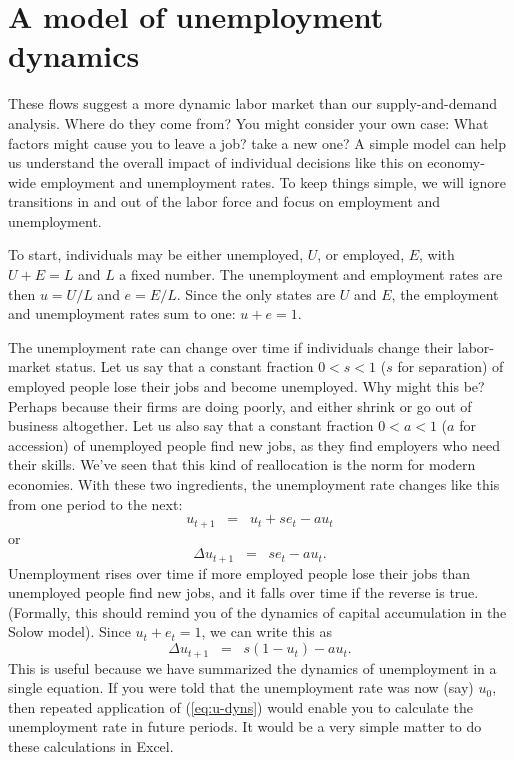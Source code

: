 \section{A model of  unemployment dynamics }

These flows suggest a more dynamic labor market than our supply-and-demand
analysis.
Where do they come from?
You might consider your own case:
What factors might cause you to leave a job?  take a new one?
A simple model can help us understand the overall
impact of individual decisions like this on economy-wide
employment and unemployment rates.
To keep things simple, we will ignore transitions in and out of the labor
force and focus on employment and unemployment.

To start, individuals may be either unemployed, $U$, or employed, $E$, with $U+E={L}$ and $L$ a fixed number.
The unemployment and employment rates are then $u=U/{L}$ and $e=E/{L}$.
Since the only states are $U$ and $E$,
the employment and unemployment rates sum to one: $ u+e=1$.

The unemployment rate can change over time if individuals
change their labor-market status.
Let us say that a constant fraction $0<s<1$ ($s$ for separation)
of employed people lose
their jobs and become unemployed.
Why might this be?  Perhaps because their firms are doing poorly,
and either shrink or go out of business altogether.
Let us also say that a constant fraction $0<a<1$ ($a$ for accession) of
unemployed people find new jobs, as they find employers who need their skills.
We've seen that this kind of reallocation is the norm for modern economies.
With these two ingredients, the unemployment rate changes like this
from one period to the next:
\begin{equation*}
    u_{t+1} \;\;=\;\; u_{t}+se_t-au_t
\end{equation*}
or
\[
    \Delta u_{t+1} \;\;=\;\; se_t-au_t .
\]
Unemployment rises over time if more employed people lose their jobs
than unemployed people find new jobs, and it falls over time if the reverse is true.
(Formally, this should remind you of the dynamics of capital accumulation in the Solow  model).
Since $u_t+e_t=1$, we can write this as
\begin{equation}
    \Delta u_{t+1} \;\;=\;\; s (1-u_{t})-a u_{t}.
    \label{eq:u-dyns}
\end{equation}
This is useful because we have summarized the dynamics of unemployment in a single equation.  If you were told that the unemployment rate was now (say)  $u_{0}$, then repeated application of (\ref{eq:u-dyns}) would enable you to calculate the unemployment rate in future periods. It would be a very simple matter to do these calculations in Excel.

